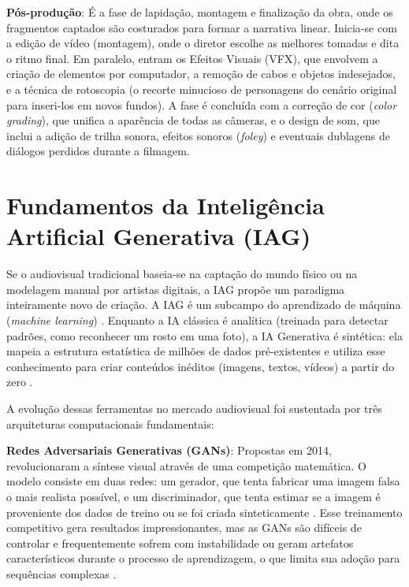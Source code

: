 \textbf{Pós-produção}: É a fase de lapidação, montagem e finalização da obra, onde os fragmentos captados são costurados para formar a narrativa linear. Inicia-se com a edição de vídeo (montagem), onde o diretor escolhe as melhores tomadas e dita o ritmo final. Em paralelo, entram os Efeitos Visuais (VFX), que envolvem a criação de elementos por computador, a remoção de cabos e objetos indesejados, e a técnica de rotoscopia (o recorte minucioso de personagens do cenário original para inseri-los em novos fundos). A fase é concluída com a correção de cor (\textit{color grading}), que unifica a aparência de todas as câmeras, e o design de som, que inclui a adição de trilha sonora, efeitos sonoros (\textit{foley}) e eventuais dublagens de diálogos perdidos durante a filmagem.

\section{Fundamentos da Inteligência Artificial Generativa (IAG)}

Se o audiovisual tradicional baseia-se na captação do mundo físico ou na modelagem manual por artistas digitais, a IAG propõe um paradigma inteiramente novo de criação. A IAG é um subcampo do aprendizado de máquina (\textit{machine learning}) \citep{russell2016artificial}. Enquanto a IA clássica é analítica (treinada para detectar padrões, como reconhecer um rosto em uma foto), a IA Generativa é sintética: ela mapeia a estrutura estatística de milhões de dados pré-existentes e utiliza esse conhecimento para criar conteúdos inéditos (imagens, textos, vídeos) a partir do zero \citep{franganillo2022}.

A evolução dessas ferramentas no mercado audiovisual foi sustentada por três arquiteturas computacionais fundamentais:

\textbf{Redes Adversariais Generativas (GANs)}: Propostas em 2014, revolucionaram a síntese visual através de uma competição matemática. O modelo consiste em duas redes: um gerador, que tenta fabricar uma imagem falsa o mais realista possível, e um discriminador, que tenta estimar se a imagem é proveniente dos dados de treino ou se foi criada sinteticamente \citep{goodfellow2014generative}. Esse treinamento competitivo gera resultados impressionantes, mas as GANs são difíceis de controlar e frequentemente sofrem com instabilidade ou geram artefatos característicos durante o processo de aprendizagem, o que limita sua adoção para sequências complexas \citep{karras2020analyzing}.

